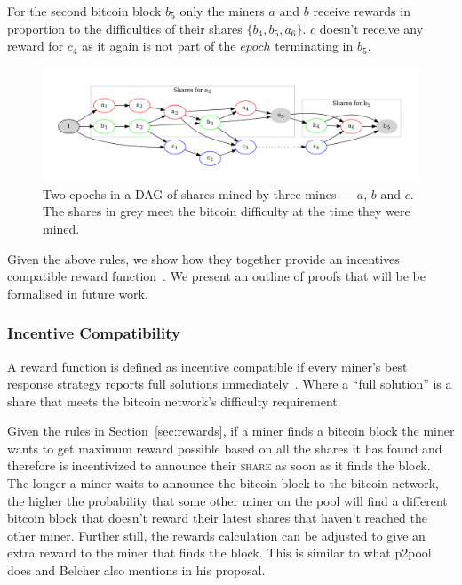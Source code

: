 \documentclass{article}
\begin{document}
For the second bitcoin block $b_5$ only the miners $a$ and $b$ receive
rewards in proportion to the difficulties of their shares
$\{b_4, b_5, a_6\}$. $c$ doesn't receive any reward for $c_4$ as it
again is not part of the $epoch$ terminating in $b_5$.

\begin{figure}
  \begin{center}
    \includegraphics[width=1.0\textwidth]{shares-dag}
    \caption{Two epochs in a DAG of shares mined by three mines ---
      $a$, $b$ and $c$. The shares in grey meet the bitcoin difficulty
      at the time they were mined.}\label{fig:shares-dag}
  \end{center}
\end{figure}

Given the above rules, we show how they together provide an incentives
compatible reward function~\cite{incentives-compatible}. We present an
outline of proofs that will be be formalised in future work.

\subsubsection{Incentive Compatibility}\label{sec:incentive-compatability}

A reward function is defined as incentive compatible if every miner's
best response strategy reports full solutions
immediately~\cite{incentives-compatible}. Where a ``full solution'' is
a share that meets the bitcoin network's difficulty requirement.

Given the rules in Section~\ref{sec:rewards}, if a miner finds a
bitcoin block the miner wants to get maximum reward possible based on
all the shares it has found and therefore is incentivized to announce
their \textsc{share} as soon as it finds the block. The longer a miner
waits to announce the bitcoin block to the bitcoin network, the higher
the probability that some other miner on the pool will find a
different bitcoin block that doesn't reward their latest shares that
haven't reached the other miner. Further still, the rewards
calculation can be adjusted to give an extra reward to the miner that
finds the block. This is similar to what p2pool does and Belcher also
mentions in his proposal.
\end{document}
